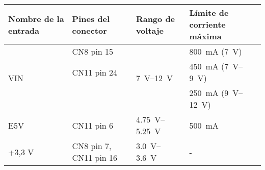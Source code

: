 \begin{tabular}{@{}p{2cm}p{2.3cm}p{2cm}p{3cm}@{}}
	\toprule
	Nombre de la entrada & Pines del conector & Rango de voltaje & Límite de corriente máxima \\ 
	\midrule
	\multirow{3}{*}{VIN} & CN8 pin 15 & \multirow{3}{*}{\SIrange{7}{12}{\volt}} & \SI{800}{\milli\ampere} (\SI{7}{\volt})\\ 
	& CN11 pin 24 & & \SI{450}{\milli\ampere} (\SIrange{7}{9}{\volt})\\ 
	& & & \SI{250}{\milli\ampere} (\SIrange{9}{12}{\volt}) \\ 
	E5V & CN11 pin 6 & \SIrange{4.75}{5.25}{\volt} & \SI{500}{\milli\ampere} \\ 
	+3,3 V & CN8 pin 7, CN11 pin 16 & \SIrange{3.0}{3.6}{\volt} & - \\ 
	\bottomrule
\end{tabular}


